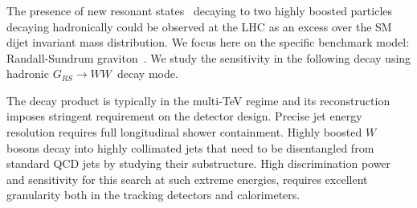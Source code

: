 \subsubsection{}




The presence of new resonant states~\cite{Harris:2011bh,Boelaert:2009jm,Lee:1973iz,Branco:2011iw,Hill:1994hp,Kaplan:1983sm,Bellazzini:2014yua,Randall:1999ee,Pomarol:1999ad} decaying to two highly boosted particles decaying hadronically could be observed at the LHC as an excess over the SM dijet invariant mass distribution. We focus here on the specific benchmark model: Randall-Sundrum graviton~\cite{Randall:1999ee}. We study the sensitivity in the following decay using hadronic $G_{RS} \rightarrow WW$\ decay mode.

The decay product is typically in the multi-TeV regime and its reconstruction imposes stringent requirement on the detector design. Precise jet energy resolution requires full longitudinal shower containment. Highly boosted $W$ bosons decay into highly collimated jets that need to  be disentangled from standard QCD jets by studying their substructure. High discrimination power and sensitivity for this search at such extreme energies, requires excellent granularity both in the tracking detectors and calorimeters. 

